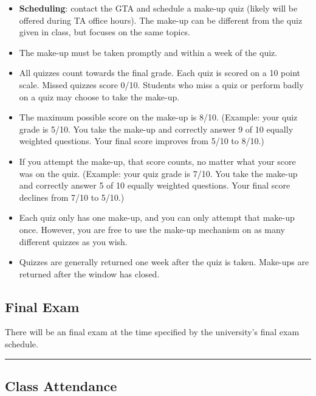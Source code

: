 \documentclass[11pt]{article}
\begin{document}
\begin{itemize}
\item \textbf{Scheduling}: contact the GTA and schedule a make-up quiz (likely will be offered during TA office hours). The make-up can be different from the quiz given in class, but focuses on the same topics.
\item
  The make-up must be taken promptly and within a week of the quiz.

\item
  All quizzes count towards the final grade. Each quiz is scored on a 10
  point scale. Missed quizzes score 0/10. Students who miss a quiz or
  perform badly on a quiz may choose to take the make-up.
\item
  The maximum possible score on the make-up is 8/10. (Example: your quiz
  grade is 5/10. You take the make-up and correctly answer 9 of 10
  equally weighted questions. Your final score improves from 5/10 to
  8/10.)
\item
  If you attempt the make-up, that score counts, no matter what your
  score was on the quiz. (Example: your quiz grade is 7/10. You take the
  make-up and correctly answer 5 of 10 equally weighted questions. Your
  final score declines from 7/10 to 5/10.)

  \item  Each quiz only has one make-up, and you can only attempt that make-up
  once. However, you are free to use the make-up mechanism on as many
  different quizzes as you wish.
\item
  Quizzes are generally returned one week after the quiz is taken.
  Make-ups are returned after the window has closed.
\end{itemize}

\subsection{Final Exam}\label{final-exam}

There will be an final exam at the time specified by the
university's final exam schedule.

\begin{center}\rule{0.5\linewidth}{0.5pt}\end{center}

\subsection{Class Attendance}\label{class-attendance}
\end{document}
